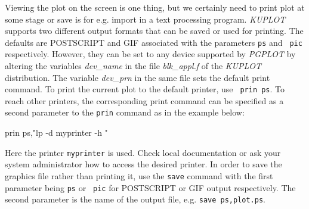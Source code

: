 Viewing the plot on the screen is one thing, but we certainly need
to print plot at some stage or save is for e.g. import in a text
processing program. {\it KUPLOT} supports two different output
formats that can be saved or used for printing. The defaults are
POSTSCRIPT and GIF associated with the parameters {\tt ps} and {\tt
pic} respectively. However, they can be set to any device supported
by {\it PGPLOT} by altering the variables {\it dev\_name} in the
file {\it blk\_appl.f} of the {\it KUPLOT} distribution. The
variable {\it dev\_prn} in the same file sets the default print
command. To print the current plot to the default printer, use {\tt
prin ps}. To reach other printers, the corresponding print command
can be specified as a second parameter to the {\tt prin} command as
in the example below:
%
\begin{MacVerbatim}
     prin ps,"lp -d myprinter -h "
\end{MacVerbatim}
%
Here the printer {\tt myprinter} is used. Check local documentation
or ask your system administrator how to access the desired printer.
In order to save the graphics file rather than printing it, use the
{\tt save} command with the first parameter being {\tt ps} or {\tt
pic} for POSTSCRIPT or GIF output respectively.  The second
parameter is the name of the output file, e.g. {\tt save
ps,plot.ps}.

